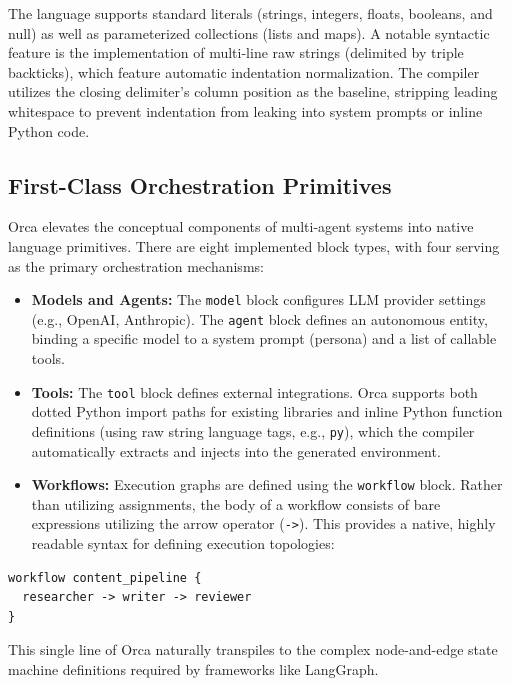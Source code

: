\documentclass[sigconf,nonacm]{acmart}
\begin{document}
The language supports standard literals (strings, integers, floats,
booleans, and null) as well as parameterized collections (lists and maps).
A notable syntactic feature is the implementation of multi-line raw strings
(delimited by triple backticks), which feature automatic indentation
normalization. The compiler utilizes the closing delimiter's column position
as the baseline, stripping leading whitespace to prevent indentation from
leaking into system prompts or inline Python code.

\subsection{First-Class Orchestration Primitives}
\label{sec:design:primitives}

Orca elevates the conceptual components of multi-agent systems into native
language primitives. There are eight implemented block types, with four
serving as the primary orchestration mechanisms:
\begin{itemize}[leftmargin=*]
  \item \textbf{Models and Agents:} The \texttt{model} block configures LLM
        provider settings (e.g., OpenAI, Anthropic). The \texttt{agent}
        block defines an autonomous entity, binding a specific model to a
        system prompt (persona) and a list of callable tools.
  \item \textbf{Tools:} The \texttt{tool} block defines external
        integrations. Orca supports both dotted Python import paths for
        existing libraries and inline Python function definitions (using raw
        string language tags, e.g., \texttt{py}), which the compiler
        automatically extracts and injects into the generated environment.
  \item \textbf{Workflows:} Execution graphs are defined using the
        \texttt{workflow} block. Rather than utilizing assignments, the body
        of a workflow consists of bare expressions utilizing the arrow
        operator (\texttt{->}). This provides a native, highly readable
        syntax for defining execution topologies:
\end{itemize}

\begin{lstlisting}[caption={Workflow topology using the arrow operator.},label={lst:orca-workflow}]
workflow content_pipeline {
  researcher -> writer -> reviewer
}
\end{lstlisting}

\noindent This single line of Orca naturally transpiles to the complex
node-and-edge state machine definitions required by frameworks like
LangGraph.
\end{document}

